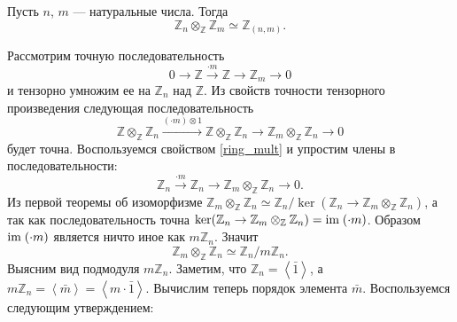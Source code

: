     \begin{Proposal}\label{task1}
        Пусть $n$, $m$ --- натуральные числа. Тогда  $$\mathbb{Z}_n \otimes_\mathbb{Z} \mathbb{Z}_m \simeq \mathbb{Z}_{(n, m)}.$$
    \end{Proposal}
    \begin{Proof}
        Рассмотрим точную последовательность
        \begin{equation*}
            0 \rightarrow \mathbb{Z} \xrightarrow{\cdot m} \mathbb{Z} \rightarrow \mathbb{Z}_m \rightarrow 0
        \end{equation*}
        и тензорно умножим ее на $\mathbb{Z}_n$ над $\mathbb{Z}$. Из свойств точности тензорного произведения следующая последовательность 
        \begin{equation*}
            \mathbb{Z} \otimes_\mathbb{Z} \mathbb{Z}_n \xrightarrow{(\cdot m) \otimes 1} \mathbb{Z} \otimes_\mathbb{Z} \mathbb{Z}_n \rightarrow \mathbb{Z}_m \otimes_\mathbb{Z} \mathbb{Z}_n \rightarrow 0
        \end{equation*}
        будет точна. Воспользуемся свойством \eqref{ring_mult} и упростим члены в последовательности:
        \begin{equation*}
            \mathbb{Z}_n \xrightarrow{\cdot m} \mathbb{Z}_n \rightarrow \mathbb{Z}_m \otimes_\mathbb{Z} \mathbb{Z}_n \rightarrow 0.
        \end{equation*}
        Из первой теоремы об изоморфизме $\mathbb{Z}_m \otimes_\mathbb{Z} \mathbb{Z}_n \simeq \mathbb{Z}_n / \ker(\mathbb{Z}_n \rightarrow \mathbb{Z}_m \otimes_\mathbb{Z} \mathbb{Z}_n)$, а так как последовательность точна
        $\ker(\mathbb{Z}_n \rightarrow \mathbb{Z}_m \otimes_\mathbb{Z} \mathbb{Z}_n) = \textup{im\;}(\cdot m)$. Образом $\textup{im\;}(\cdot m)$ является ничто иное как $m\mathbb{Z}_n$. 
        Значит 
        \begin{equation*}
            \mathbb{Z}_m \otimes_\mathbb{Z} \mathbb{Z}_n \simeq \mathbb{Z}_n / m\mathbb{Z}_n.
        \end{equation*}
        Выясним вид подмодуля $m\mathbb{Z}_n$. Заметим, что $\mathbb{Z}_n = \left<\bar 1\right>$, а  
        $m\mathbb{Z}_n = \left< \bar m \right> = \left< m \cdot \bar 1\right>$. Вычислим теперь порядок элемента $\bar m$. Воспользуемся следующим утверждением: 
        

\end{Proof}
